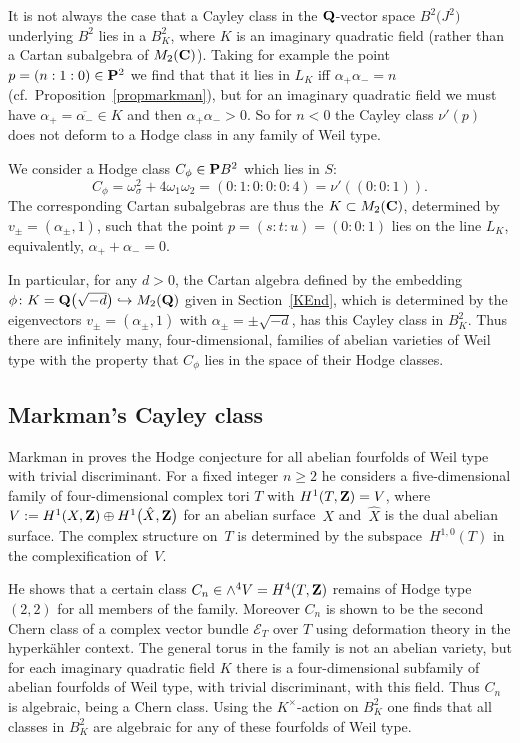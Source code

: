 \documentclass[pdftex]{sigma}
\numberwithin{equation}{section}
\begin{document}
It is not always the case that a Cayley class in the ${\bf Q}$-vector space $B^2\big(J^2\big)$
underlying $B^2$ lies in a $B^2_K$, where $K$ is an imaginary quadratic field (rather than a
Cartan subalgebra of $M_2({\bf C})$). Taking for example the point $p=(n:1:0)\in {\bf P}^2$ we find that
that it lies in $L_K$ iff $\alpha_+\alpha_-=n$ (cf.\ Proposition~\ref{propmarkman}),
but for an imaginary quadratic field we must have
$\alpha_+=\overline{\alpha_-}\in K$ and then $\alpha_+\alpha_->0$. So for $n<0$ the Cayley class
$\nu'(p)$ does not deform to a Hodge class in any family of Weil type.

\begin{Example} We consider a Hodge class $C_\phi\in {\bf P} B^2$ which lies
in $S$:
\[
C_\phi = \omega_\sigma^2 + 4\omega_1\omega_2 = (0:1:0:0:0:4) = \nu'((0:0:1)).
\]
The corresponding Cartan subalgebras are thus the $K\subset M_2({\bf C})$,
determined by $v_\pm=(\alpha_\pm,1)$, such that the point
$p=(s:t:u)=(0:0:1)$ lies on the line $L_K$,
equivalently, $\alpha_++\alpha_-=0$.

In particular, for any $d>0$, the Cartan algebra defined by
the embedding $\phi\colon K={\bf Q}\big(\sqrt{-d}\big)\allowbreak \hookrightarrow M_2({\bf Q})$ given in Section~\ref{KEnd},
which is determined by the eigenvectors $v_\pm=(\alpha_\pm,1)$ with $\alpha_\pm=\pm\sqrt{-d}$,
has this Cayley class in $B^2_K$. Thus there are infinitely many, four-dimensional,
families of abelian varieties of Weil type with the property that $C_\phi$ lies
in the space of their Hodge classes.
\end{Example}

\subsection{Markman's Cayley class}
Markman in \cite{Markman} proves the Hodge conjecture
for all abelian fourfolds of Weil type with trivial discriminant.
For a fixed integer $n\geq 2$ he considers a
five-dimensional family of four-dimensional complex tori $T$ with
$H^1(T,{\bf Z})=V$, where $V:=H^1(X,{\bf Z})\oplus H^1\big(\hat{X},{\bf Z}\big)$ for an
abelian surface~$X$ and~$\hat{X}$ is the dual abelian surface.
The complex structure on~$T$ is determined by the subspace~$H^{1,0}(T)$
in the complexification of~$V$.

He shows that a certain class $C_n\in \wedge^4V= H^4(T,{\bf Z})$ remains of Hodge type $(2,2)$
for all members of the family. Moreover $C_n$ is shown to be
the second Chern class of a complex vector bundle ${\mathcal E}_T$ over $T$
using deformation theory in the hyperk\"ahler context.
The general torus in the family is not an abelian variety, but for each
imaginary quadratic field $K$ there is a four-dimensional subfamily of
abelian fourfolds of Weil type, with trivial discriminant, with this field.
Thus $C_n$ is algebraic, being a Chern class. Using the $K^\times$-action on $B^2_K$
one finds that all classes in $B^2_K$ are algebraic for any of these fourfolds of Weil type.
\end{document}
